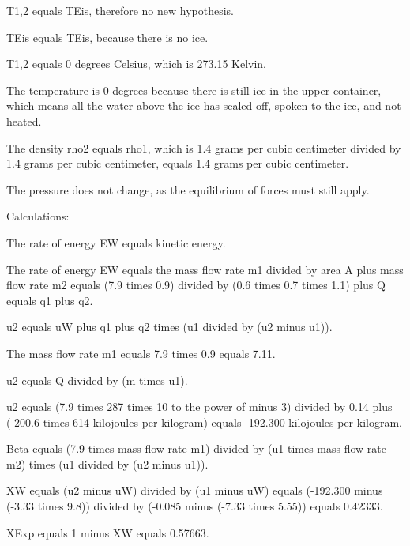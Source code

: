 T1,2 equals TEis, therefore no new hypothesis.

TEis equals TEis, because there is no ice.

T1,2 equals 0 degrees Celsius, which is 273.15 Kelvin.

The temperature is 0 degrees because there is still ice in the upper container, which means all the water above the ice has sealed off, spoken to the ice, and not heated.

The density rho2 equals rho1, which is 1.4 grams per cubic centimeter divided by 1.4 grams per cubic centimeter, equals 1.4 grams per cubic centimeter.

The pressure does not change, as the equilibrium of forces must still apply.

Calculations:

The rate of energy EW equals kinetic energy.

The rate of energy EW equals the mass flow rate m1 divided by area A plus mass flow rate m2 equals (7.9 times 0.9) divided by (0.6 times 0.7 times 1.1) plus Q equals q1 plus q2.

u2 equals uW plus q1 plus q2 times (u1 divided by (u2 minus u1)).

The mass flow rate m1 equals 7.9 times 0.9 equals 7.11.

u2 equals Q divided by (m times u1).

u2 equals (7.9 times 287 times 10 to the power of minus 3) divided by 0.14 plus (-200.6 times 614 kilojoules per kilogram) equals -192.300 kilojoules per kilogram.

Beta equals (7.9 times mass flow rate m1) divided by (u1 times mass flow rate m2) times (u1 divided by (u2 minus u1)).

XW equals (u2 minus uW) divided by (u1 minus uW) equals (-192.300 minus (-3.33 times 9.8)) divided by (-0.085 minus (-7.33 times 5.55)) equals 0.42333.

XExp equals 1 minus XW equals 0.57663.